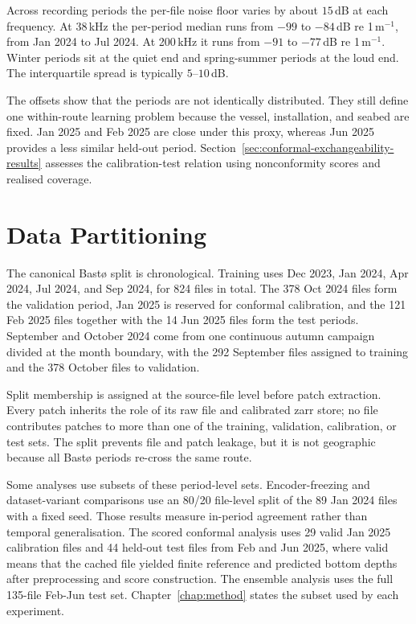 Across recording periods the per-file noise floor varies by about $15$\,dB at each frequency. At 38\,kHz the per-period median runs from $-99$ to $-84$\,dB re 1\,m$^{-1}$, from Jan 2024 to Jul 2024. At 200\,kHz it runs from $-91$ to $-77$\,dB re 1\,m$^{-1}$. Winter periods sit at the quiet end and spring-summer periods at the loud end. The interquartile spread is typically $5$--$10$\,dB.

The offsets show that the periods are not identically distributed. They still define one within-route learning problem because the vessel, installation, and seabed are fixed. Jan 2025 and Feb 2025 are close under this proxy, whereas Jun 2025 provides a less similar held-out period. Section~\ref{sec:conformal-exchangeability-results} assesses the calibration-test relation using nonconformity scores and realised coverage.

\section{Data Partitioning}
\label{sec:data-partitioning}

The canonical Bast\o{} split is chronological. Training uses Dec 2023, Jan 2024, Apr 2024, Jul 2024, and Sep 2024, for 824 files in total. The 378 Oct 2024 files form the validation period, Jan 2025 is reserved for conformal calibration, and the 121 Feb 2025 files together with the 14 Jun 2025 files form the test periods. September and October 2024 come from one continuous autumn campaign divided at the month boundary, with the 292 September files assigned to training and the 378 October files to validation.

Split membership is assigned at the source-file level before patch extraction. Every patch inherits the role of its raw file and calibrated zarr store; no file contributes patches to more than one of the training, validation, calibration, or test sets. The split prevents file and patch leakage, but it is not geographic because all Bast\o{} periods re-cross the same route.

Some analyses use subsets of these period-level sets. Encoder-freezing and dataset-variant comparisons use an 80/20 file-level split of the 89 Jan 2024 files with a fixed seed. Those results measure in-period agreement rather than temporal generalisation. The scored conformal analysis uses 29 valid Jan 2025 calibration files and 44 held-out test files from Feb and Jun 2025, where valid means that the cached file yielded finite reference and predicted bottom depths after preprocessing and score construction. The ensemble analysis uses the full 135-file Feb-Jun test set. Chapter~\ref{chap:method} states the subset used by each experiment.

